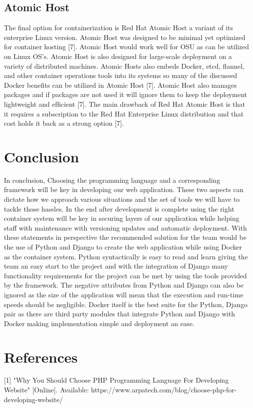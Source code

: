 \documentclass[onecolumn, draftclsnofoot,10pt, compsoc]{IEEEtran}
\begin{document}
\subsection{Atomic Host}
The ﬁnal option for containerization is Red Hat Atomic Host a variant of its enterprise Linux version. Atomic Host was designed to be minimal yet optimized for container hosting [7]. Atomic Host would work well for OSU as can be utilized on Linux OS’s. Atomic Host is also designed for large-scale deployment on a variety of distributed machines. Atomic Hosts also embeds Docker, etcd, ﬂannel, and other container operations tools into its systems so many of the discussed Docker beneﬁts can be utilized in Atomic Host [7]. Atomic Host also manages packages and if packages are not used it will ignore them to keep the deployment lightweight and efﬁcient [7]. The main drawback of Red Hat Atomic Host is that it requires a subscription to the Red Hat Enterprise Linux distribution and that cost holds it back as a strong option [7].

\section{Conclusion}
In conclusion, Choosing the programming language and a corresponding framework will be key in developing our web application. These two aspects can dictate how we approach various situations and the set of tools we will have to tackle those hassles. In the end after development is complete using the right container system will be key in securing layers of our application while helping staff with maintenance with versioning updates and automatic deployment. With these statements in perspective the recommended solution for the team would be the use of Python and Django to create the web application while using Docker as the container system. Python syntactically is easy to read and learn giving the team an easy start to the project and with the integration of Django many functionality requirements for the project can be met by using the tools provided by the framework. The negative attributes from Python and Django can also be ignored as the size of the application will mean that the execution and run-time speeds should be negligible. Docker itself is the best suite for the Python, Django pair as there are third party modules that integrate Python and Django with Docker making implementation simple and deployment an ease. 


\newpage
\section*{References}
[1] "Why You Should Choose PHP Programming Language For Developing Website" [Online]. Available: https://www.arpatech.com/blog/choose-php-for-developing-website/
\end{document}
